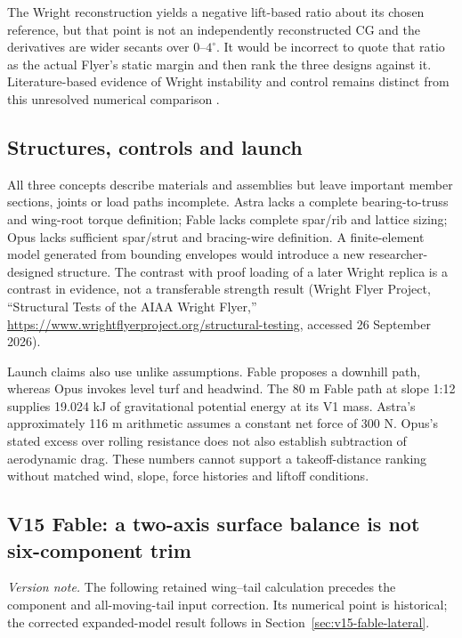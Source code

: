 \documentclass[11pt,a4paper]{article}
\begin{document}
The Wright reconstruction yields a negative lift-based ratio about its chosen reference, but that point is not an independently reconstructed CG and the derivatives are wider secants over $0$--$4^\circ$. It would be incorrect to quote that ratio as the actual Flyer's static margin and then rank the three designs against it. Literature-based evidence of Wright instability and control remains distinct from this unresolved numerical comparison \cite{ref6,ref10}.

\subsection{Structures, controls and launch}
All three concepts describe materials and assemblies but leave important member sections, joints or load paths incomplete. Astra lacks a complete bearing-to-truss and wing-root torque definition; Fable lacks complete spar/rib and lattice sizing; Opus lacks sufficient spar/strut and bracing-wire definition. A finite-element model generated from bounding envelopes would introduce a new researcher-designed structure. The contrast with proof loading of a later Wright replica is a contrast in evidence, not a transferable strength result (Wright Flyer Project, ``Structural Tests of the AIAA Wright Flyer,'' \url{https://www.wrightflyerproject.org/structural-testing}, accessed 26 September 2026).

Launch claims also use unlike assumptions. Fable proposes a downhill path, whereas Opus invokes level turf and headwind. The 80 m Fable path at slope 1:12 supplies 19.024 kJ of gravitational potential energy at its V1 mass. Astra's approximately 116 m arithmetic assumes a constant net force of 300 N. Opus's stated excess over rolling resistance does not also establish subtraction of aerodynamic drag. These numbers cannot support a takeoff-distance ranking without matched wind, slope, force histories and liftoff conditions.

\subsection{V15 Fable: a two-axis surface balance is not six-component trim}
\noindent\textit{Version note.} The following retained wing--tail calculation precedes the component and all-moving-tail input correction. Its numerical point is historical; the corrected expanded-model result follows in Section~\ref{sec:v15-fable-lateral}.

\label{sec:v15-fable-gate}
\end{document}
